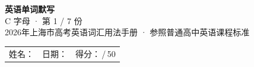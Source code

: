 \documentclass[10pt,a4paper]{article}
\begin{document}
\pagestyle{plain}

\begin{center}
{\LARGE\bfseries 英语单词默写}\\[0.22em]
{\large C 字母 · 第 1 / 7 份}\\[0.18em]
{\small 2026年上海市高考英语词汇用法手册 · 参照普通高中英语课程标准}
\end{center}

\vspace{0.25em}
\noindent\begin{tabular}{@{}p{}@{}p{}@{}p{}@{}}
姓名：\underline{\hspace{2.0cm}} & 日期：\underline{\hspace{2.0cm}} & 得分：\underline{\hspace{1.3cm}}\,/\,50 \\
\end{tabular}

\vspace{0.3em}

\vspace{0.08em}
\end{document}
